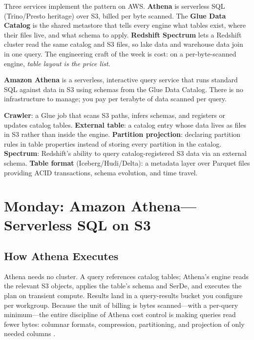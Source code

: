 Three services implement the pattern on AWS. \textbf{Athena} is serverless SQL (Trino/Presto heritage) over S3, billed per byte scanned. The \textbf{Glue Data Catalog} is the shared metastore that tells every engine what tables exist, where their files live, and what schema to apply. \textbf{Redshift Spectrum} lets a Redshift cluster read the same catalog and S3 files, so lake data and warehouse data join in one query. The engineering craft of the week is cost: on a per-byte-scanned engine, \emph{table layout is the price list}.

\begin{definitionbox}
\textbf{Amazon Athena} is a serverless, interactive query service that runs standard SQL against data in S3 using schemas from the Glue Data Catalog. There is no infrastructure to manage; you pay per terabyte of data scanned per query.
\end{definitionbox}

\begin{keyterms}
\textbf{Crawler}: a Glue job that scans S3 paths, infers schemas, and registers or updates catalog tables. \textbf{External table}: a catalog entry whose data lives as files in S3 rather than inside the engine. \textbf{Partition projection}: declaring partition rules in table properties instead of storing every partition in the catalog. \textbf{Spectrum}: Redshift's ability to query catalog-registered S3 data via an external schema. \textbf{Table format} (Iceberg/Hudi/Delta): a metadata layer over Parquet files providing ACID transactions, schema evolution, and time travel.
\end{keyterms}

\section{Monday: Amazon Athena---Serverless SQL on S3}
\subsection{How Athena Executes}
Athena needs no cluster. A query references catalog tables; Athena's engine reads the relevant S3 objects, applies the table's schema and SerDe, and executes the plan on transient compute. Results land in a query-results bucket you configure per workgroup. Because the unit of billing is bytes scanned---with a per-query minimum---the entire discipline of Athena cost control is making queries read fewer bytes: columnar formats, compression, partitioning, and projection of only needed columns \cite{awsAthenaDocs}.

